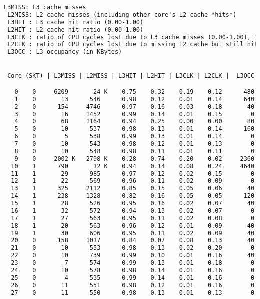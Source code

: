 \begin{lstlisting}[language=TeX]
 L3MISS: L3 cache misses
 L2MISS: L2 cache misses (including other core's L2 cache *hits*)
 L3HIT : L3 cache hit ratio (0.00-1.00)
 L2HIT : L2 cache hit ratio (0.00-1.00)
 L3CLK : ratio of CPU cycles lost due to L3 cache misses (0.00-1.00), in some cases could be >1.0 due to a higher memory latency
 L2CLK : ratio of CPU cycles lost due to missing L2 cache but still hitting  L3 cache (0.00-1.00)
 L3OCC : L3 occupancy (in KBytes)


 Core (SKT) | L3MISS | L2MISS | L3HIT | L2HIT | L3CLK | L2CLK |  L3OCC

   0    0     6209       24 K    0.75    0.32    0.19    0.12      480
   1    0       13      546      0.98    0.12    0.01    0.14      640
   2    0      154     4746      0.97    0.16    0.03    0.18       40
   3    0       16     1452      0.99    0.14    0.01    0.15        0
   4    0       68     1164      0.94    0.25    0.00    0.00       80
   5    0       10      537      0.98    0.13    0.01    0.14      160
   6    0        5      538      0.99    0.13    0.01    0.14        0
   7    0       10      543      0.98    0.12    0.01    0.13        0
   8    0       10      548      0.98    0.11    0.01    0.11        0
   9    0     2002 K   2798 K    0.28    0.74    0.20    0.02     2360
  10    1      790       12 K    0.94    0.14    0.08    0.24     4640
  11    1       29      985      0.97    0.12    0.02    0.15        0
  12    1       22      569      0.96    0.11    0.02    0.09        0
  13    1      325     2112      0.85    0.15    0.05    0.06       40
  14    1      238     1328      0.82    0.16    0.05    0.05      120
  15    1       28      526      0.95    0.16    0.02    0.07       40
  16    1       32      572      0.94    0.13    0.02    0.07        0
  17    1       27      563      0.95    0.11    0.02    0.08        0
  18    1       20      563      0.96    0.12    0.01    0.09       40
  19    1       30      606      0.95    0.11    0.02    0.09       40
  20    0      158     1017      0.84    0.07    0.08    0.13       40
  21    0       10      553      0.98    0.13    0.02    0.20        0
  22    0       10      739      0.99    0.10    0.01    0.16       40
  23    0        7      574      0.99    0.13    0.01    0.18        0
  24    0       10      578      0.98    0.14    0.01    0.16        0
  25    0        4      535      0.99    0.14    0.01    0.16        0
  26    0       11      551      0.98    0.12    0.01    0.16        0
  27    0       11      550      0.98    0.13    0.01    0.13        0

\end{lstlisting}
